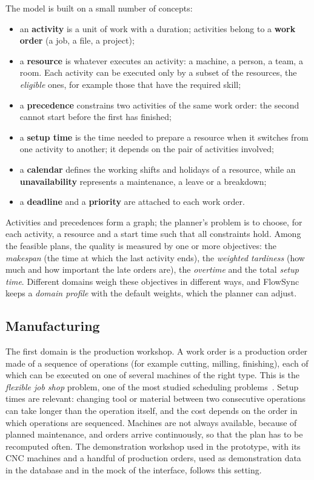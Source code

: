 The model is built on a small number of concepts:

\begin{itemize}
  \item an \textbf{activity} is a unit of work with a duration; activities belong to a
        \textbf{work order} (a job, a file, a project);
  \item a \textbf{resource} is whatever executes an activity: a machine, a person, a team, a room.
        Each activity can be executed only by a subset of the resources, the \emph{eligible}
        ones, for example those that have the required skill;
  \item a \textbf{precedence} constrains two activities of the same work order: the second cannot
        start before the first has finished;
  \item a \textbf{setup time} is the time needed to prepare a resource when it switches from one
        activity to another; it depends on the pair of activities involved;
  \item a \textbf{calendar} defines the working shifts and holidays of a resource, while an
        \textbf{unavailability} represents a maintenance, a leave or a breakdown;
  \item a \textbf{deadline} and a \textbf{priority} are attached to each work order.
\end{itemize}

Activities and precedences form a graph; the planner's problem is to choose, for each activity,
a resource and a start time such that all constraints hold. Among the feasible plans, the
quality is measured by one or more objectives: the \emph{makespan} (the time at which the last
activity ends), the \emph{weighted tardiness} (how much and how important the late orders are),
the \emph{overtime} and the total \emph{setup time}. Different domains weigh these objectives in
different ways, and FlowSync keeps a \emph{domain profile} with the default weights, which the
planner can adjust.

\subsection{Manufacturing}
\label{sec:domain-factory}

The first domain is the production workshop. A work order is a production order made of a
sequence of operations (for example cutting, milling, finishing), each of which can be executed
on one of several machines of the right type. This is the \emph{flexible job shop} problem, one of
the most studied scheduling problems~\cite{brandimarte1993}. Setup times are relevant: changing
tool or material between two consecutive operations can take longer than the operation itself, and
the cost depends on the order in which operations are sequenced. Machines are not always
available, because of planned maintenance, and orders arrive continuously, so that the plan has to
be recomputed often. The demonstration workshop used in the prototype, with its CNC machines and a
handful of production orders, used as demonstration data in the database and in the mock of the
interface, follows this setting.

